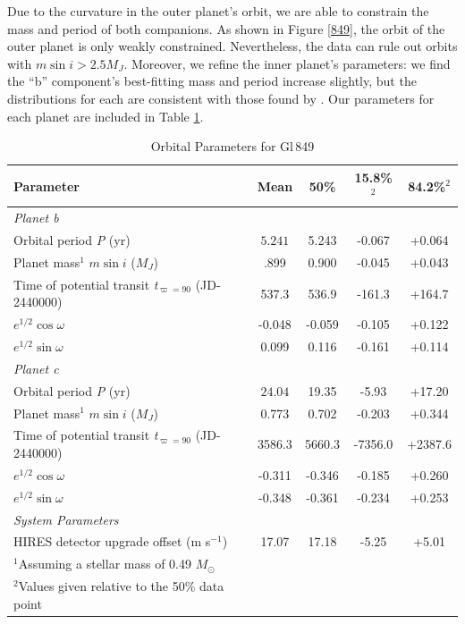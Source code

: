 Due to the curvature in the outer planet's orbit, we are able to constrain the mass and period of both companions. As shown in Figure \ref{849}, the orbit of the outer planet is only weakly constrained. Nevertheless, the data can rule out orbits with $m \sin i > 2.5 M_J$. Moreover, we refine the inner planet's parameters: we find the ``b'' component's best-fitting mass and period increase slightly, but the distributions for each are consistent with those found by \citet{Butler06}. Our parameters for each planet are included in Table \ref{T849}.

\begin{table}[hbt!]
\footnotesize
\centering
\begin{tabular}{lcccc}
\hline
Parameter & Mean & 50\% & 15.8\%$^2$ & 84.2\%$^2$ \\
    \hline
     \textit{Planet b} &   \\
  Orbital period \textit{P} (yr) & $5.241$ & 5.243 & -0.067 & +0.064  \\ 
  Planet mass$^{1}$ \textit{$m \sin i$} ($M_J$) & .899 & 0.900 & -0.045 & +0.043 \\
  Time of potential transit \textit{t$_{\varpi=90}$} (JD-2440000) & 537.3 & 536.9 & -161.3 & +164.7 \\
  $e^{1/2} \cos{\omega}$ & -0.048 & -0.059 & -0.105 & +0.122 \\
  $e^{1/2} \sin{\omega}$ & 0.099 & 0.116 & -0.161 & +0.114 \\
     \textit{Planet c} & \\
  Orbital period \textit{P} (yr) & $24.04$ & 19.35 & -5.93 & +17.20  \\ 
  Planet mass$^{1}$ \textit{$m \sin i$} ($M_J$) & 0.773 & 0.702 & -0.203 & +0.344 \\
  Time of potential transit \textit{t$_{\varpi=90}$} (JD-2440000) & 3586.3 & 5660.3 & -7356.0 & +2387.6\\
  $e^{1/2} \cos{\omega}$ & -0.311 & -0.346 & -0.185 & +0.260 \\
  $e^{1/2} \sin{\omega}$ & -0.348 & -0.361 & -0.234 & +0.253 \\
     \textit{System Parameters} & \\
  HIRES detector upgrade offset (m s$^{-1}$) & 17.07 & 17.18 & -5.25 & +5.01 \\
\hline
 $^1$Assuming a stellar mass of 0.49 $M_{\odot}$ \\
 $^2$Values given relative to the 50\% data point 
\end{tabular}
\caption{Orbital Parameters for Gl\,849}

\label{T849}
\end{table}

